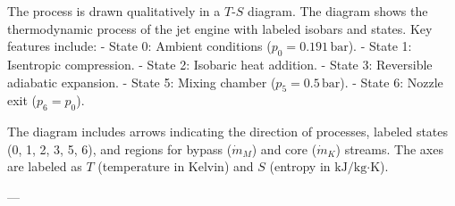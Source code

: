 The process is drawn qualitatively in a \( T \)-\( S \) diagram. The diagram shows the thermodynamic process of the jet engine with labeled isobars and states. Key features include:  
- State 0: Ambient conditions (\( p_0 = 0.191 \, \text{bar} \)).  
- State 1: Isentropic compression.  
- State 2: Isobaric heat addition.  
- State 3: Reversible adiabatic expansion.  
- State 5: Mixing chamber (\( p_5 = 0.5 \, \text{bar} \)).  
- State 6: Nozzle exit (\( p_6 = p_0 \)).  

The diagram includes arrows indicating the direction of processes, labeled states (0, 1, 2, 3, 5, 6), and regions for bypass (\( \dot{m}_M \)) and core (\( \dot{m}_K \)) streams. The axes are labeled as \( T \) (temperature in Kelvin) and \( S \) (entropy in \( \text{kJ}/\text{kg·K} \)).  

---